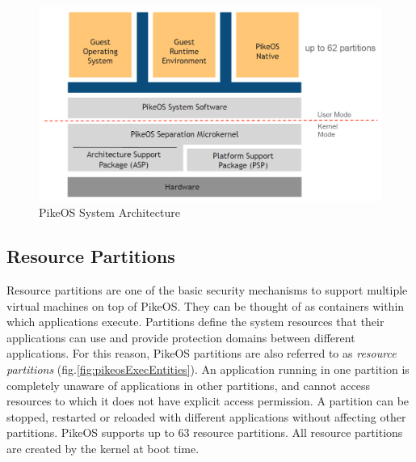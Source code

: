\begin{figure}[htbp] 
\centering    
\includegraphics[width=1.0\textwidth]{PikeosArchitecture2}
\caption{PikeOS System Architecture}
\label{fig:pikeosarch}
\end{figure}


\subsection{Resource Partitions}
Resource partitions are one of the basic security mechanisms to support multiple virtual machines on top of PikeOS. They can be thought of as containers within which applications execute. Partitions define the system resources that their applications can use and provide protection domains between different applications. For this reason, PikeOS partitions are also referred to as \emph{resource partitions} (fig.\ref{fig:pikeosExecEntities}). An application running in one partition is completely unaware of applications in other partitions, and cannot access resources to which it does not have explicit access permission. A partition can be stopped, restarted or reloaded with different applications without affecting other partitions. PikeOS supports up to 63 resource partitions. All resource partitions are created by the kernel at boot time.

